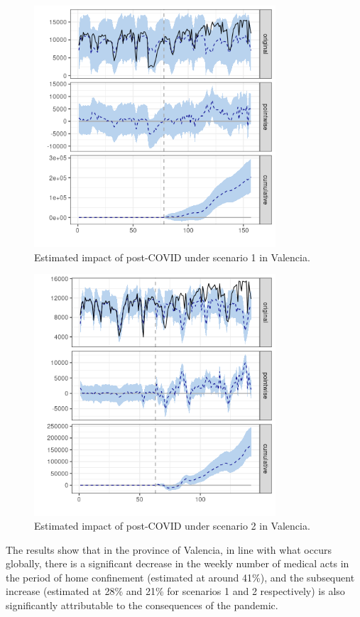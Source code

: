 \documentclass[9pt]{osa-supplemental-document}
\begin{document}
\begin{center}
\begin{figure}[H]
\includegraphics[width=9cm]{global_post_scen1_Valencia.png}\caption{Estimated impact of post-COVID under scenario 1 in Valencia.}
\end{figure}
\end{center}

\begin{center}
  \begin{figure}[H]
    \includegraphics[width=9cm]{global_post_scen2_Valencia.png}\caption{Estimated impact of post-COVID under scenario 2 in Valencia.}
  \end{figure}
  \end{center}

The results show that in the province of Valencia, in line with what occurs globally, there is a significant decrease in the weekly number of medical acts in the period of home confinement (estimated at around 41\%), and the subsequent increase (estimated at 28\% and 21\% for scenarios 1 and 2 respectively) is also significantly attributable to the consequences of the pandemic.
\end{document}

